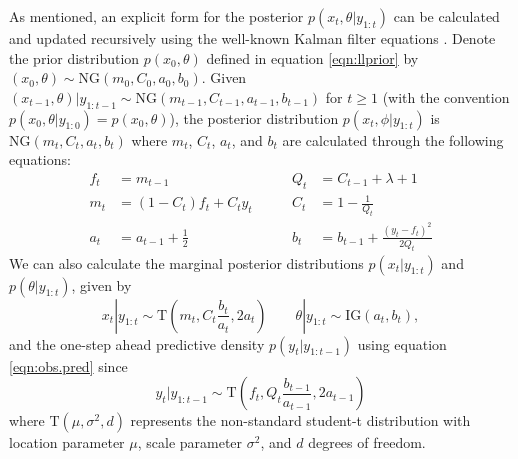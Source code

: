 \documentclass{article}
\begin{document}
As mentioned, an explicit form for the posterior $p(x_t,\theta|y_{1:t})$ can be calculated and updated recursively using the well-known Kalman filter equations \cite[Chap. 2]{petris2009dynamic}. Denote the prior distribution $p(x_0, \theta)$ defined in equation \eqref{eqn:llprior} by $(x_0, \theta) \sim \mbox{NG}(m_0, C_0, a_0, b_0)$. Given $(x_{t-1},\theta)|y_{1:t-1} \sim \mbox{NG}(m_{t-1},C_{t-1}, a_{t-1}, b_{t-1})$ for $t \ge 1$ (with the convention $p(x_0,\theta|y_{1:0}) = p(x_0, \theta)$), the posterior distribution $p(x_t,\phi|y_{1:t})$ is $\mbox{NG}(m_t,C_t,a_t,b_t)$ where $m_t$, $C_t$, $a_t$, and $b_t$ are calculated through the following equations:
\begin{align}
f_t &= m_{t-1} &\qquad Q_t &= C_{t-1} + \lambda + 1 \label{eqn:obs.pred} \\
m_t &= (1 - C_t)f_t + C_ty_t &\qquad C_t &= 1 - \frac{1}{Q_t} \\
a_t &= a_{t-1} + \frac{1}{2} &\qquad b_t &= b_{t-1} + \frac{(y_t-f_t)^2}{2Q_t}
\end{align}
We can also calculate the marginal posterior distributions $p(x_t|y_{1:t})$ and $p(\theta|y_{1:t})$, given by
\begin{equation}
x_t|y_{1:t} \sim \mbox{T}(m_t,C_t \frac{b_t}{a_t},2a_t) \qquad \theta|y_{1:t} \sim \mbox{IG}(a_t, b_t), \label{eqn:margpost}
\end{equation}
and the one-step ahead predictive density $p(y_t|y_{1:t-1})$ using equation \eqref{eqn:obs.pred} since \[y_t|y_{1:t-1} \sim \mbox{T}(f_t,Q_t \frac{b_{t-1}}{a_{t-1}},2a_{t-1})\]
where $\mbox{T}(\mu,\sigma^2,d)$ represents the non-standard student-t distribution with location parameter $\mu$, scale parameter $\sigma^2$, and $d$ degrees of freedom.
\end{document}
